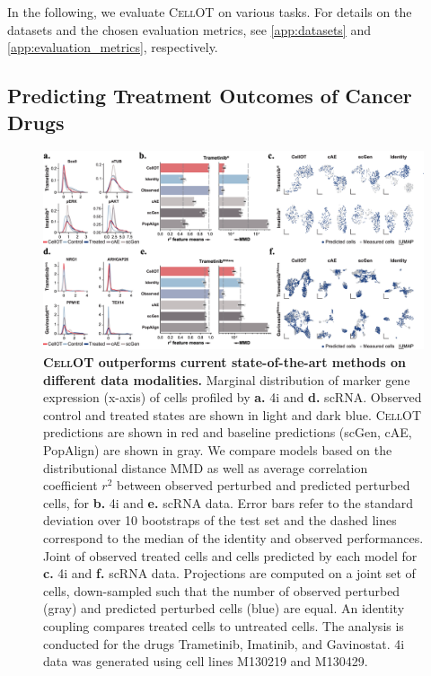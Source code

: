 In the following, we evaluate \textsc{CellOT} on various tasks. For details on the datasets and the chosen evaluation metrics, see \cref{app:datasets} and \cref{app:evaluation_metrics}, respectively.

\subsection{Predicting Treatment Outcomes of Cancer Drugs}

\begin{figure}[t]
    \centering
    \includegraphics[width=\textwidth]{figures/fig_benchmark_cellot.png}
    \caption{ \textbf{\textsc{CellOT} outperforms current state-of-the-art methods on different data modalities.}  Marginal distribution of marker gene expression (x-axis) of cells profiled by \textbf{a.} 4i and \textbf{d.} scRNA. Observed control and treated states are shown in light and dark blue. \textsc{CellOT} predictions are shown in red and baseline predictions (scGen, cAE, PopAlign) are shown in gray. We compare models based on the distributional distance \acrshort{MMD} as well as average correlation coefficient $r^2$ between observed perturbed and predicted perturbed cells, for \textbf{b.} 4i and \textbf{e.} scRNA data. Error bars refer to the standard deviation over 10 bootstraps of the test set and the dashed lines correspond to the median of the identity and observed performances. Joint  of observed treated cells and cells predicted by each model for \textbf{c.} 4i and \textbf{f.} scRNA data. Projections are computed on a joint set of cells, down-sampled such that the number of observed perturbed (gray) and predicted perturbed cells (blue) are equal. An identity coupling compares treated cells to untreated cells. The analysis is conducted for the drugs Trametinib, Imatinib, and Gavinostat. 4i data was generated using cell lines M130219 and M130429.}
    \label{fig:benchmark_cellot}
\end{figure}

